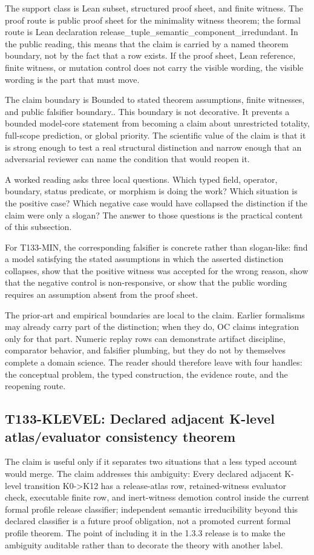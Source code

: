 The support class is Lean subset, structured proof sheet, and finite witness. The proof route is public proof sheet for the minimality witness theorem; the formal route is Lean declaration release\_tuple\_semantic\_component\_irredundant. In the public reading, this means that the claim is carried by a named theorem boundary, not by the fact that a row exists. If the proof sheet, Lean reference, finite witness, or mutation control does not carry the visible wording, the visible wording is the part that must move.

The claim boundary is Bounded to stated theorem assumptions, finite witnesses, and public falsifier boundary.. This boundary is not decorative. It prevents a bounded model-core statement from becoming a claim about unrestricted totality, full-scope prediction, or global priority. The scientific value of the claim is that it is strong enough to test a real structural distinction and narrow enough that an adversarial reviewer can name the condition that would reopen it.

A worked reading asks three local questions. Which typed field, operator, boundary, status predicate, or morphism is doing the work? Which situation is the positive case? Which negative case would have collapsed the distinction if the claim were only a slogan? The answer to those questions is the practical content of this subsection.

For T133-MIN, the corresponding falsifier is concrete rather than slogan-like: find a model satisfying the stated assumptions in which the asserted distinction collapses, show that the positive witness was accepted for the wrong reason, show that the negative control is non-responsive, or show that the public wording requires an assumption absent from the proof sheet.

The prior-art and empirical boundaries are local to the claim. Earlier formalisms may already carry part of the distinction; when they do, OC claims integration only for that part. Numeric replay rows can demonstrate artifact discipline, comparator behavior, and falsifier plumbing, but they do not by themselves complete a domain science. The reader should therefore leave with four handles: the conceptual problem, the typed construction, the evidence route, and the reopening route.

\subsection{T133-KLEVEL: Declared adjacent K-level atlas/evaluator consistency theorem}
The claim is useful only if it separates two situations that a less typed account would merge. The claim addresses this ambiguity: Every declared adjacent K-level transition K0-\textgreater{}K12 has a release-atlas row, retained-witness evaluator check, executable finite row, and inert-witness demotion control inside the current formal profile release classifier; independent semantic irreducibility beyond this declared classifier is a future proof obligation, not a promoted current formal profile theorem. The point of including it in the 1.3.3 release is to make the ambiguity auditable rather than to decorate the theory with another label.


